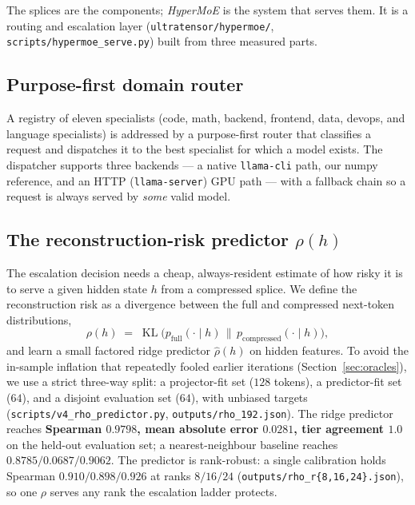 \documentclass[11pt]{article}
\newcommand{\code}[1]{\texttt{#1}}
\DeclareMathOperator{\KL}{KL}
\begin{document}
The splices are the components; \emph{HyperMoE} is the system that serves them.
It is a routing and escalation layer (\code{ultratensor/hypermoe/},
\code{scripts/hypermoe\_serve.py}) built from three measured parts.

\subsection{Purpose-first domain router}

A registry of eleven specialists (code, math, backend, frontend, data, devops,
and language specialists) is addressed by a purpose-first router that classifies
a request and dispatches it to the best specialist for which a model exists. The
dispatcher supports three backends --- a native \code{llama-cli} path, our numpy
reference, and an HTTP (\code{llama-server}) GPU path --- with a fallback chain
so a request is always served by \emph{some} valid model.

\subsection{The reconstruction-risk predictor \texorpdfstring{$\rho(h)$}{rho(h)}}
\label{sec:rho}

The escalation decision needs a cheap, always-resident estimate of how risky it
is to serve a given hidden state $h$ from a compressed splice. We define the
reconstruction risk as a divergence between the full and compressed next-token
distributions,
\begin{equation}
  \rho(h) \;=\; \KL\!\big(p_{\text{full}}(\cdot\mid h)\,\|\,p_{\text{compressed}}(\cdot\mid h)\big),
  \label{eq:rho}
\end{equation}
and learn a small factored ridge predictor $\hat\rho(h)$ on hidden features. To
avoid the in-sample inflation that repeatedly fooled earlier iterations
(Section~\ref{sec:oracles}), we use a strict three-way split: a projector-fit
set ($128$ tokens), a predictor-fit set ($64$), and a disjoint evaluation set
($64$), with unbiased targets (\code{scripts/v4\_rho\_predictor.py},
\code{outputs/rho\_192.json}). The ridge predictor reaches
\textbf{Spearman $0.9798$, mean absolute error $0.0281$, tier agreement $1.0$}
on the held-out evaluation set; a nearest-neighbour baseline reaches
$0.8785/0.0687/0.9062$. The predictor is rank-robust: a single calibration holds
Spearman $0.910/0.898/0.926$ at ranks $8/16/24$
(\code{outputs/rho\_r\{8,16,24\}.json}), so one $\rho$ serves any rank the
escalation ladder protects.
\end{document}
